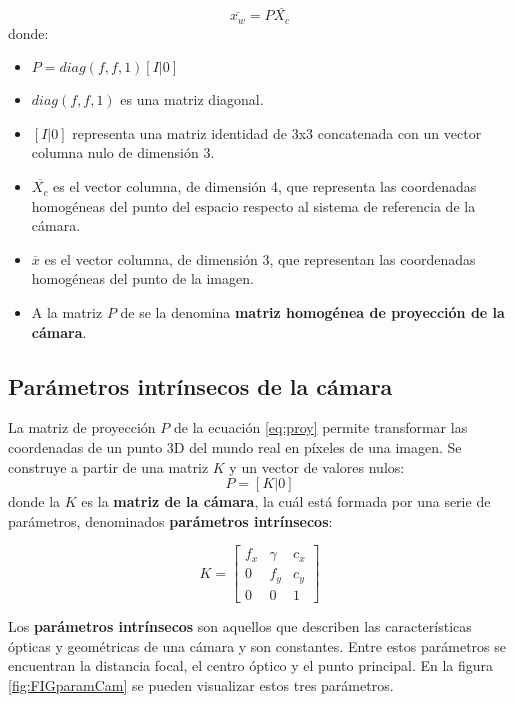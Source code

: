 \begin{equation}\label{eq:proy}
\overline{x_w} = P \overline{X_c}   
\end{equation}
donde:
\begin{itemize}
\item $P = diag(f, f, 1) [I|0]$
\item $diag(f, f, 1)$ es una matriz diagonal.
\item $[I|0]$ representa una matriz identidad de 3x3 concatenada con un vector columna nulo de dimensión 3.
\item $\overline{X_c}$  es el vector columna, de dimensión 4, que representa las coordenadas homogéneas del punto del espacio respecto al sistema de referencia de la cámara.
\item $\overline{x}$  es el vector columna, de dimensión 3, que representan las coordenadas homogéneas del punto de la imagen.
\item A la matriz $P$ de se la denomina \textbf{matriz homogénea de proyección de la cámara}.
\end{itemize}


\subsection{Parámetros intrínsecos de la cámara}
La matriz de proyección $P$ de la ecuación \ref{eq:proy} permite transformar las coordenadas de un punto 3D del mundo real en píxeles de una imagen. Se construye a partir de una matriz $K$ y un vector de valores nulos:
\begin{equation}
 P = [K|0] 
\end{equation}
donde la $K$ es la \textbf{matriz de la cámara}, la cuál está formada por una serie de parámetros, denominados \textbf{parámetros intrínsecos}:

\begin{equation}
  K =
  \begin{bmatrix}
    f_{x} & \gamma & {c_{x}} \\
    {0}&{f_{y}}&{c_{y}}\\
    {0}&{0}&{1}
  \end{bmatrix}
\end{equation}

Los \textbf{parámetros intrínsecos} son aquellos que describen las características ópticas y geométricas de una cámara y son constantes. Entre estos parámetros se encuentran la distancia focal, el centro óptico y el punto principal. En la figura \ref{fig:FIGparamCam} se pueden visualizar estos tres parámetros.

